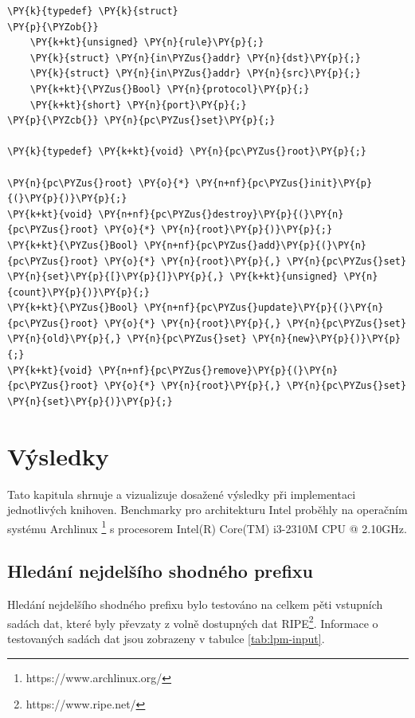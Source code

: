 \begin{Verbatim}[commandchars=\\\{\}]
\PY{k}{typedef} \PY{k}{struct}
\PY{p}{\PYZob{}}
	\PY{k+kt}{unsigned} \PY{n}{rule}\PY{p}{;}
	\PY{k}{struct} \PY{n}{in\PYZus{}addr} \PY{n}{dst}\PY{p}{;}
	\PY{k}{struct} \PY{n}{in\PYZus{}addr} \PY{n}{src}\PY{p}{;}
	\PY{k+kt}{\PYZus{}Bool} \PY{n}{protocol}\PY{p}{;}
	\PY{k+kt}{short} \PY{n}{port}\PY{p}{;}
\PY{p}{\PYZcb{}} \PY{n}{pc\PYZus{}set}\PY{p}{;}

\PY{k}{typedef} \PY{k+kt}{void} \PY{n}{pc\PYZus{}root}\PY{p}{;}

\PY{n}{pc\PYZus{}root} \PY{o}{*} \PY{n+nf}{pc\PYZus{}init}\PY{p}{(}\PY{p}{)}\PY{p}{;}
\PY{k+kt}{void} \PY{n+nf}{pc\PYZus{}destroy}\PY{p}{(}\PY{n}{pc\PYZus{}root} \PY{o}{*} \PY{n}{root}\PY{p}{)}\PY{p}{;}
\PY{k+kt}{\PYZus{}Bool} \PY{n+nf}{pc\PYZus{}add}\PY{p}{(}\PY{n}{pc\PYZus{}root} \PY{o}{*} \PY{n}{root}\PY{p}{,} \PY{n}{pc\PYZus{}set} \PY{n}{set}\PY{p}{[}\PY{p}{]}\PY{p}{,} \PY{k+kt}{unsigned} \PY{n}{count}\PY{p}{)}\PY{p}{;}
\PY{k+kt}{\PYZus{}Bool} \PY{n+nf}{pc\PYZus{}update}\PY{p}{(}\PY{n}{pc\PYZus{}root} \PY{o}{*} \PY{n}{root}\PY{p}{,} \PY{n}{pc\PYZus{}set} \PY{n}{old}\PY{p}{,} \PY{n}{pc\PYZus{}set} \PY{n}{new}\PY{p}{)}\PY{p}{;}
\PY{k+kt}{void} \PY{n+nf}{pc\PYZus{}remove}\PY{p}{(}\PY{n}{pc\PYZus{}root} \PY{o}{*} \PY{n}{root}\PY{p}{,} \PY{n}{pc\PYZus{}set} \PY{n}{set}\PY{p}{)}\PY{p}{;}
\end{Verbatim}



\chapter{Výsledky}\label{chapter:results}
Tato kapitula shrnuje a vizualizuje dosažené výsledky při implementaci jednotlivých knihoven.
Benchmarky pro architekturu Intel proběhly na operačním systému Archlinux \footnote{https://www.archlinux.org/} s procesorem Intel(R) Core(TM) i3-2310M CPU @ 2.10GHz.

\section{Hledání nejdelšího shodného prefixu}

Hledání nejdelšího shodného prefixu bylo testováno na celkem pěti vstupních sadách dat, které
byly převzaty z volně dostupných dat RIPE\footnote{https://www.ripe.net/}.
Informace o testovaných sadách dat jsou zobrazeny v tabulce \ref{tab:lpm-input}.

